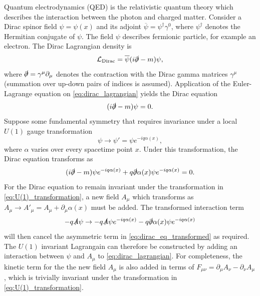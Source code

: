 Quantum electrodynamics (QED) is the relativistic quantum theory which describes the interaction between the photon and charged matter.
Consider a Dirac spinor field $\psi = \psi(x)$ and its adjoint $\overline{\psi} = \psi^\dagger \gamma^0$, where $\psi^\dagger$ denotes the Hermitian conjugate of $\psi$.
The field $\psi$ describes fermionic \spinhalf particle, for example an electron.
The Dirac Lagrangian density is
%
\begin{equation}\label{eq:dirac_lagrangian}
  \mathcal{L}_{\textnormal{Dirac}} = \overline{\psi} (i \slashed{\partial}  - m )\psi,
\end{equation}
%
where $\slashed{\partial} = \gamma^\mu \partial_\mu$ denotes the contraction with the Dirac gamma matrices $\gamma^\mu$ (summation over up-down pairs of indices is assumed).
Application of the Euler-Lagrange equation on \cref{eq:dirac_lagrangian} yields the Dirac equation
%
\begin{equation}\label{eq:dirac_eq}
  (i \slashed{\partial}  - m )\psi = 0 .
\end{equation}
%
Suppose some fundamental symmetry that requires invariance under a local $U(1)$ gauge transformation
%
\begin{equation}\label{eq:U(1)_transformation}
  \psi \rightarrow \psi' = \psi e^{- i q \alpha(x)} ,
\end{equation}
%
where $\alpha$ varies over every spacetime point $x$.
Under this transformation, the Dirac equation transforms as 
%
\begin{equation}\label{eq:dirac_eq_transformed}
  (i \slashed{\partial} - m ) \psi e^{- i q \alpha(x)} + q \slashed{\partial}\alpha(x) \psi e^{- i q \alpha(x)} = 0.
\end{equation}
%
For the Dirac equation to remain invariant under the transformation in \cref{eq:U(1)_transformation}, a new field $A_\mu$ which transforms as $A_\mu \rightarrow A'_\mu = A_\mu + \partial_\mu \alpha(x)$ must be added.
The transformed interaction term
%
\begin{equation}
  - q \slashed{A} \psi \rightarrow - q \slashed{A} \psi e^{- i q \alpha(x)} - q \slashed{\partial} \alpha(x) \psi e^{- i q \alpha(x)}
\end{equation}
%
will then cancel the asymmetric term in \cref{eq:dirac_eq_transformed} as required.
The $U(1)$ invariant Lagrangain can therefore be constructed by adding an interaction between $\psi$ and $A_\mu$ to \cref{eq:dirac_lagrangian}. For completeness, the kinetic term for the the new field $A_\mu$ is also added in terms of $F_{\mu\nu} = \partial_\mu A_\nu - \partial_\nu A_\mu$, which is trivially invariant under the transformation in \cref{eq:U(1)_transformation}.
